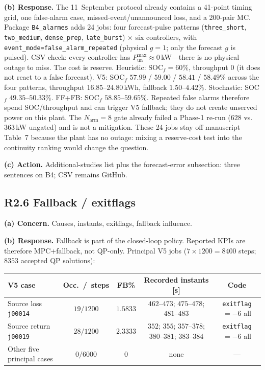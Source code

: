 \documentclass[11pt]{article}
\begin{document}
\textbf{(b) Response.} The 11~September protocol already contains a 41-point timing grid, one false-alarm case, missed-event/unannounced loss, and a 200-pair MC. Package \texttt{B4\_alarmes} adds 24 jobs: four forecast-pulse patterns (\texttt{three\_short}, \texttt{two\_medium}, \texttt{dense\_prep}, \texttt{late\_burst}) $\times$ six controllers, with \texttt{event\_mode=false\_alarm\_repeated} (physical $g{=}1$; only the forecast $g$ is pulsed). CSV check: every controller has $P_{\mathrm{un}}^{\max}\approx 0$\,kW---there is no physical outage to miss. The cost is reserve. Heuristic: SOC$_f=60\%$, throughput $0$ (it does not react to a false forecast). V5: SOC$_f$ $57.99$ / $59.00$ / $58.41$ / $58.49\%$ across the four patterns, throughput $16.85$--$24.80$\,kWh, fallback $1.50$--$4.42\%$. Stochastic: SOC$_f$ $49.35$--$50.33\%$. FF+FB: SOC$_f$ $58.85$--$59.65\%$. Repeated false alarms therefore spend SOC/throughput and can trigger V5 fallback; they do not create unserved power on this plant. The $N_{\mathrm{arm}}{=}8$ gate already failed a Phase-1 re-run ($628$ vs.\ $363$\,kW ungated) and is not a mitigation. These 24 jobs stay off manuscript Table~7 because the plant has no outage: mixing a reserve-cost test into the continuity ranking would change the question.

\textbf{(c) Action.} Additional-studies list plus the forecast-error subsection: three sentences on B4; CSV remains GitHub.

\subsection*{R2.6 Fallback / exitflags}
\textbf{(a) Concern.} Causes, instants, exitflags, fallback influence.

\textbf{(b) Response.} Fallback is part of the closed-loop policy. Reported KPIs are therefore MPC+fallback, not QP-only. Principal V5 jobs ($7\times 1200=8400$ steps; $8353$ accepted QP solutions):

\begin{center}
{\footnotesize
\begin{tabular}{@{}lcccc@{}}
\toprule
V5 case & Occ.\ /\ steps & FB\% & Recorded instants [s] & Code \\
\midrule
Source loss \texttt{j00014} & $19/1200$ & $1.5833$ & $462$--$473$; $475$--$478$; $481$--$483$ & \texttt{exitflag}$=-6$ all \\
Source return \texttt{j00019} & $28/1200$ & $2.3333$ & $352$; $355$; $357$--$378$; $380$--$381$; $383$--$384$ & \texttt{exitflag}$=-6$ all \\
Other five principal cases & $0/6000$ & $0$ & none & --- \\
\bottomrule
\end{tabular}}
\end{center}
\end{document}
